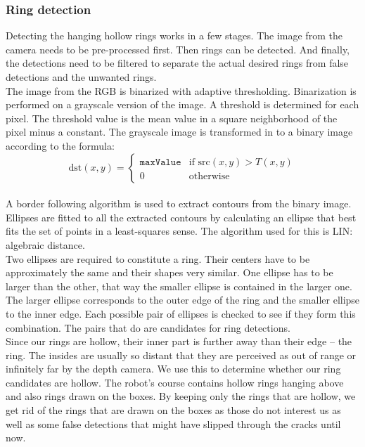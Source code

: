\documentclass[a4paper,
  twoside, %
  headlines=2.1 %
  ]{scrartcl}
\begin{document}
\subsubsection{Ring detection}
Detecting the hanging hollow rings works in a few stages. The image from the camera needs to be pre-processed first. Then rings can be detected. And finally, the detections need to be filtered to separate the actual desired rings from false detections and the unwanted rings. 
\\
The image from the RGB is binarized with adaptive thresholding. Binarization is performed on a grayscale version of the image. A threshold is determined for each pixel. The threshold value is the mean value in a square neighborhood of the pixel minus a constant. The grayscale image is transformed in to a binary image according to the formula: 
\\
\begin{equation*}
\text{dst}(x, y) = \begin{cases} 
\texttt{maxValue} & \text{if } \text{src}(x, y) > T(x, y) \\ 
0 & \text{otherwise} 
\end{cases}
\end{equation*}
\\
A border following algorithm is used to extract contours from the binary image.
\\
Ellipses are fitted to all the extracted contours by calculating an ellipse that best fits the set of points in a least-squares sense. The algorithm used for this is LIN: algebraic distance. 
\\
Two ellipses are required to constitute a ring. Their centers have to be approximately the same and their shapes very similar. One ellipse has to be larger than the other, that way the smaller ellipse is contained in the larger one. The larger ellipse corresponds to the outer edge of the ring and the smaller ellipse to the inner edge. Each possible pair of ellipses is checked to see if they form this combination. The pairs that do are candidates for ring detections. 
\\
Since our rings are hollow, their inner part is further away than their edge – the ring. The insides are usually so distant that they are perceived as out of range or infinitely far by the depth camera. We use this to determine whether our ring candidates are hollow. The robot’s course contains hollow rings hanging above and also rings drawn on the boxes. By keeping only the rings that are hollow, we get rid of the rings that are drawn on the boxes as those do not interest us as well as some false detections that might have slipped through the cracks until now. 
\end{document}
